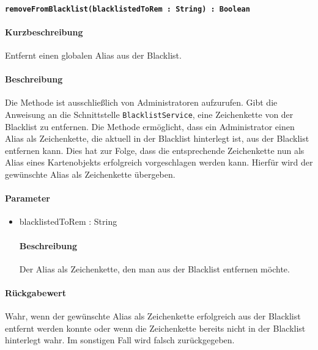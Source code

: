 \paragraph*{\texttt{removeFromBlacklist(blacklistedToRem : String) : Boolean}}%
\paragraph*{Kurzbeschreibung}
Entfernt einen globalen Alias aus der Blacklist.
\paragraph*{Beschreibung}
Die Methode ist ausschließlich von Administratoren aufzurufen.
Gibt die Anweisung an die Schnittstelle \texttt{BlacklistService}, eine Zeichenkette von der Blacklist zu entfernen.
Die Methode ermöglicht, dass ein Administrator einen Alias als Zeichenkette, die aktuell in der Blacklist hinterlegt ist, aus der Blacklist entfernen kann.
Dies hat zur Folge, dass die entsprechende Zeichenkette nun als Alias eines Kartenobjekts erfolgreich vorgeschlagen werden kann.
Hierfür wird der gewünschte Alias als Zeichenkette übergeben.
\paragraph*{Parameter}
\begin{itemize}
    \item blacklistedToRem : String
    		\paragraph*{Beschreibung}
    		Der Alias als Zeichenkette, den man aus der Blacklist entfernen möchte.
\end{itemize}
\paragraph*{Rückgabewert}
Wahr, wenn der gewünschte Alias als Zeichenkette erfolgreich aus der Blacklist entfernt werden konnte oder wenn die Zeichenkette bereits nicht in der Blacklist hinterlegt wahr. Im sonstigen Fall wird falsch zurückgegeben.
